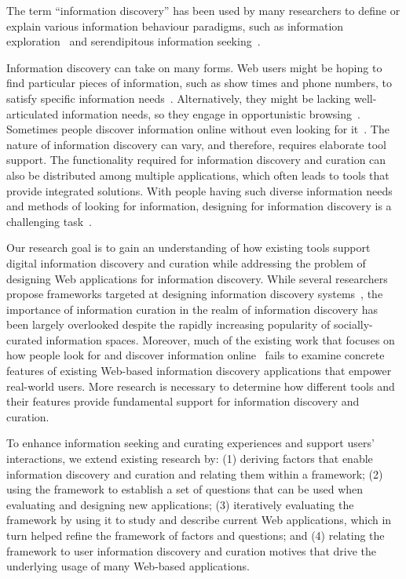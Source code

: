 \documentclass{sigchi}
\begin{document}
The term ``information discovery'' has been used by many researchers to define or explain various information behaviour paradigms, such as information exploration~\cite{waterworth1991model} and serendipitous information seeking~\cite{foster2003serendipity}.   

Information discovery can take on many forms. Web users might be hoping to find particular pieces of information, such as show times and phone numbers, to satisfy specific information needs~\cite{proper1999information}. Alternatively, they might be lacking well-articulated information needs, so they engage in opportunistic browsing~\cite{lindley2012s}. Sometimes people discover information online without even looking for it~\cite{bates1986exploratory}. The nature of information discovery can vary, and therefore, requires elaborate tool support. The functionality required for information discovery and curation can also be distributed among multiple applications, which often leads to tools that provide integrated solutions. With people having such diverse information needs and methods of looking for information, designing for information discovery is a challenging task~\cite{conaway2010designing, marchionini2006exploratory}.

Our research goal is to gain an understanding of how existing tools support digital information discovery and curation while addressing the problem of designing Web applications for information discovery. While several researchers propose frameworks targeted at designing information discovery systems~\cite{proper1999information, kerne2004information}, the importance of information curation in the realm of information discovery has been largely overlooked despite the rapidly increasing popularity of socially-curated information spaces. Moreover, much of the existing work that focuses on how people look for and discover information online~\cite{bates1986exploratory, choo2000information, ellis1989behavioural, kellar2006goal, lindley2012s, morrison2001taxonomic, sellen2002knowledge} fails to examine concrete features of existing Web-based information discovery applications that empower real-world users. More research is necessary to determine how different tools and their features provide fundamental support for information discovery and curation.

To enhance information seeking and curating experiences and support users' interactions, we extend existing research by: (1) deriving factors that enable information discovery and curation and relating them within a framework; (2) using the framework to establish a set of questions that can be used when evaluating and designing new applications; (3) iteratively evaluating the framework by using it to study and describe current Web applications, which in turn helped refine the framework of factors and questions; and (4) relating the framework to user information discovery and curation motives that drive the underlying usage of many Web-based applications.
\end{document}
